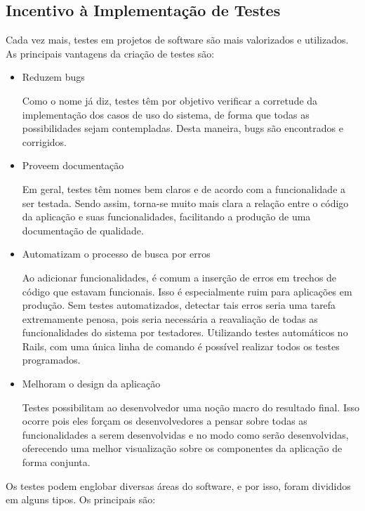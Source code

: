 \subsection{Incentivo à Implementação de Testes}

Cada vez mais, testes em projetos de software são mais valorizados e utilizados. As principais vantagens da criação de testes são:

\begin{itemize}
\item Reduzem bugs

Como o nome já diz, testes têm por objetivo verificar a corretude da implementação dos casos de uso do sistema, de forma que todas as possibilidades sejam contempladas. Desta maneira, bugs são encontrados e corrigidos.

\item Proveem documentação

Em geral, testes têm nomes bem claros e de acordo com a funcionalidade a ser testada. Sendo assim, torna-se muito mais clara a relação entre o código da aplicação e suas funcionalidades, facilitando a produção de uma documentação de qualidade.

\item Automatizam o processo de busca por erros

Ao adicionar funcionalidades, é comum a inserção de erros em trechos de código que estavam funcionais. Isso é especialmente ruim para aplicações em produção. Sem testes automatizados, detectar tais erros seria uma tarefa extremamente penosa, pois seria necessária a reavaliação de todas as funcionalidades do sistema por testadores. Utilizando testes automáticos no Rails, com uma única linha de comando é possível realizar todos os testes programados.

\item Melhoram o design da aplicação

Testes possibilitam ao desenvolvedor uma noção macro do resultado final. Isso ocorre pois eles forçam os desenvolvedores a pensar sobre todas as funcionalidades a serem desenvolvidas e no modo como serão desenvolvidas, oferecendo uma melhor visualização sobre os componentes da aplicação de forma conjunta.

\end{itemize}

Os testes podem englobar diversas áreas do software, e por isso, foram divididos em alguns tipos. Os principais são:

